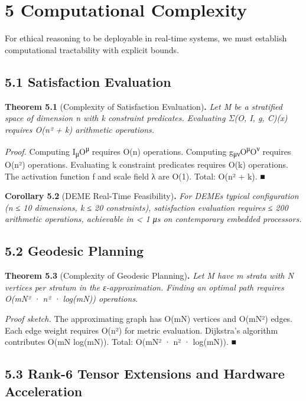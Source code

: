 \documentclass[12pt]{article}
\theoremstyle{plain}
\theoremstyle{definition}
\theoremstyle{remark}
\begin{document}
\section{5 Computational Complexity}\label{computational-complexity}

For ethical reasoning to be deployable in real-time systems, we must
establish computational tractability with explicit bounds.

\subsection{5.1 Satisfaction Evaluation}\label{satisfaction-evaluation}

\textbf{Theorem 5.1} (Complexity of Satisfaction Evaluation)\textbf{.}
\emph{Let M be a stratified space of dimension n with k constraint
predicates. Evaluating Σ(O, I, g, C)(x) requires O(n² + k) arithmetic
operations.}

\emph{Proof.} Computing I\textsubscript{μ}O\textsuperscript{μ} requires
O(n) operations. Computing
g\textsubscript{μν}O\textsuperscript{μ}O\textsuperscript{ν} requires
O(n²) operations. Evaluating k constraint predicates requires O(k)
operations. The activation function f and scale field λ are O(1). Total:
O(n² + k). ■

\textbf{Corollary 5.2} (DEME Real-Time Feasibility)\textbf{.} \emph{For
DEME\textquotesingle s typical configuration (n ≤ 10 dimensions, k ≤ 20
constraints), satisfaction evaluation requires ≤ 200 arithmetic
operations, achievable in \textless{} 1 μs on contemporary embedded
processors.}

\subsection{5.2 Geodesic Planning}\label{geodesic-planning}

\textbf{Theorem 5.3} (Complexity of Geodesic Planning)\textbf{.}
\emph{Let M have m strata with N vertices per stratum in the
ε-approximation. Finding an optimal path requires O(mN² · n² · log(mN))
operations.}

\emph{Proof sketch.} The approximating graph has O(mN) vertices and
O(mN²) edges. Each edge weight requires O(n²) for metric evaluation.
Dijkstra's algorithm contributes O(mN log(mN)). Total: O(mN² · n² ·
log(mN)). ■

\subsection{5.3 Rank-6 Tensor Extensions and Hardware Acceleration}\label{rank6-acceleration}
\end{document}
